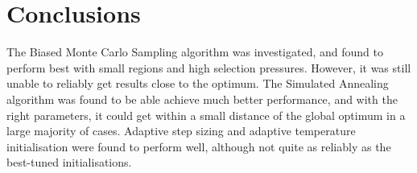 \documentclass[10pt]{article}
\begin{document}
\section{Conclusions}

The Biased Monte Carlo Sampling algorithm was investigated, and found to
perform best with small regions and high selection pressures. However, it was
still unable to reliably get results close to the optimum. The Simulated
Annealing algorithm was found to be able achieve much better performance, and
with the right parameters, it could get within a small distance of the global
optimum in a large majority of cases. Adaptive step sizing \cite{parks} and
adaptive temperature initialisation \cite{kirk} \cite{white:261} were found to
perform well, although not quite as reliably as the best-tuned
initialisations.

{}

\end{document}
